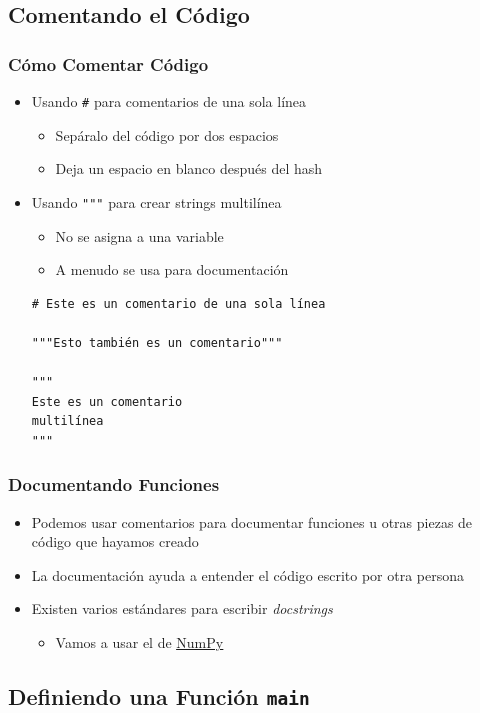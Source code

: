 \documentclass[11pt]{beamer}
\begin{document}
\subsection{Comentando el Código}

\begin{frame}[fragile]\frametitle{Cómo Comentar Código}
\begin{itemize}
\item Usando \lstinline|#| para comentarios de una sola línea
    \begin{itemize}
    \item Sepáralo del código por dos espacios
    \item Deja un espacio en blanco después del hash
    \end{itemize}
\item Usando \lstinline|"""| para crear strings multilínea
    \begin{itemize}
    \item No se asigna a una variable
    \item A menudo se usa para documentación
    \end{itemize}
\begin{lstlisting}
# Este es un comentario de una sola línea

"""Esto también es un comentario"""

"""
Este es un comentario
multilínea
"""
\end{lstlisting}
\end{itemize}
\end{frame}

\begin{frame}\frametitle{Documentando Funciones}
\begin{itemize}
\item Podemos usar comentarios para documentar funciones u otras piezas de código que hayamos creado
\item La documentación ayuda a entender el código escrito por otra persona
\item Existen varios estándares para escribir \textit{docstrings}
    \begin{itemize}
    \item Vamos a usar el de \href{https://numpydoc.readthedocs.io/en/latest/format.html}{\color{blue}\underline{NumPy}}
    \end{itemize}
\end{itemize}
\end{frame}

\subsection{Definiendo una Función \texttt{main}}
\end{document}
